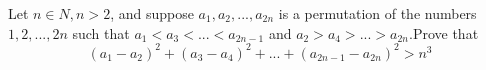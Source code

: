 Let $n\in{N},n>2$, and suppose $a_1,a_2,...,a_{2n}$ is a permutation of the numbers $1,2,...,2n$ such that $a_1<a_3<...<a_{2n-1}$ and $a_2>a_4>...>a_{2n}.$Prove that\[(a_1-a_2)^2+(a_3-a_4)^2+...+(a_{2n-1}-a_{2n})^2>n^3\]

